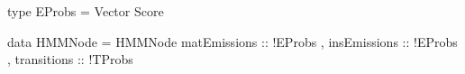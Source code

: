 type EProbs = Vector Score

data HMMNode = HMMNode { matEmissions :: !EProbs
                       , insEmissions :: !EProbs
                       , transitions  :: !TProbs
                       }
